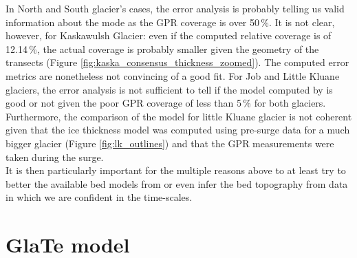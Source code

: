 \documentclass[a4, 12pt]{article}
\newcommand{\fref}[1]{(Figure \ref{#1})}
\begin{document}
In North and South glacier's cases, the error analysis is probably telling us valid information about the mode as the GPR coverage is over 50\,\%. It is not clear, however, for Kaskawulsh Glacier: even if the computed relative coverage is of 12.14\,\%, the actual coverage is probably smaller given the geometry of the transects \fref{fig:kaska_consensus_thickness_zoomed}. The computed error metrics are nonetheless not convincing of a good fit. For Job and Little Kluane glaciers, the error analysis is not sufficient to tell if the model computed by \citet{farinotti2019consensus} is good or not given the poor GPR coverage of less than 5\,\% for both glaciers. Furthermore, the comparison of the model for little Kluane glacier is not coherent given that the ice thickness model was computed using pre-surge data for a much bigger glacier \fref{fig:lk_outlines} and that the GPR measurements were taken during the surge. 
\\
It is then particularly important for the multiple reasons above to at least try to better the available bed models from \citet{farinotti2019conensus} or even infer the bed topography from data in which we are confident in the time-scales.
\FloatBarrier

\section{GlaTe model}
\end{document}
